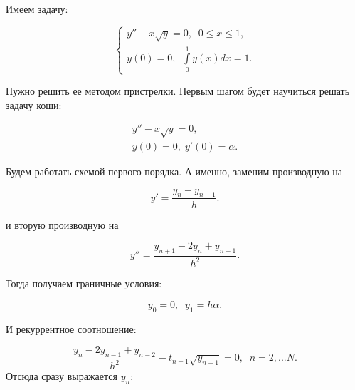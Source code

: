 \documentclass[a4paper]{article}
\begin{document}
\begin{sol}
Имеем задачу:

$$
\begin{cases}
y''- x \sqrt{y} = 0,\;\; 0\leq x\leq 1,\\
y(0) = 0,\;\; \int\limits_0^1 y(x) dx = 1.
\end{cases}
$$

Нужно решить ее методом пристрелки.
Первым шагом будет научиться решать задачу коши:

\begin{gather*}
y'' - x\sqrt{y} = 0,\\
y(0) = 0,\; y'(0) = \alpha.
\end{gather*}

Будем работать схемой первого порядка. А именно, заменим производную на

$$
y' = \frac{y_n - y_{n-1}}{h}.
$$

и вторую производную на

$$
y'' = \frac{y_{n+1} - 2y_n + y_{n-1}}{h^2}.
$$

Тогда получаем граничные условия:

$$
y_0 = 0,\;\; y_1 = h\alpha.
$$

И рекуррентное соотношение:

$$
\frac{y_{n} - 2y_{n-1} + y_{n-2}}{h^2} - t_{n-1} \sqrt{y_{n-1}} = 0,\;\; n=2,...N.
$$
Отсюда сразу выражается $y_n$:


\end{sol}
\end{document}
